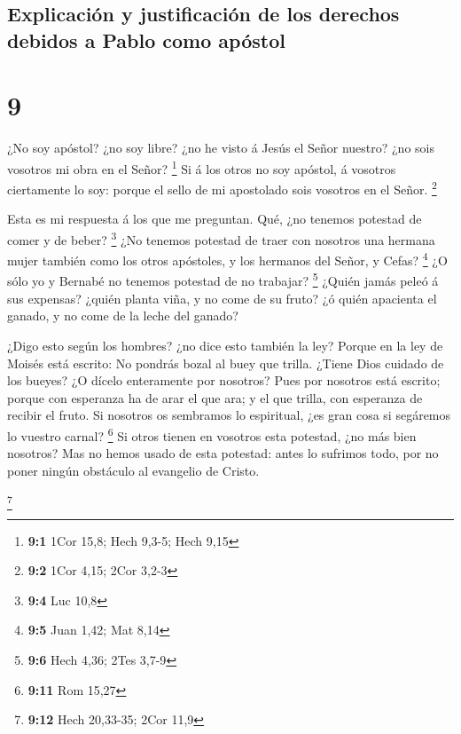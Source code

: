\hypertarget{explicaciuxf3n-y-justificaciuxf3n-de-los-derechos-debidos-a-pablo-como-apuxf3stol}{%
\subsection{Explicación y justificación de los derechos debidos a Pablo
como
apóstol}\label{explicaciuxf3n-y-justificaciuxf3n-de-los-derechos-debidos-a-pablo-como-apuxf3stol}}

\hypertarget{section-8}{%
\section{9}\label{section-8}}

 ¿No soy apóstol? ¿no soy libre? ¿no he visto á Jesús el
Señor nuestro? ¿no sois vosotros mi obra en el Señor? \footnote{\textbf{9:1}
  1Cor 15,8; Hech 9,3-5; Hech 9,15}  Si á los otros no soy
apóstol, á vosotros ciertamente lo soy: porque el sello de mi apostolado
sois vosotros en el Señor. \footnote{\textbf{9:2} 1Cor 4,15; 2Cor 3,2-3}

 Esta es mi respuesta á los que me preguntan.
 Qué, ¿no tenemos potestad de comer y de beber?
\footnote{\textbf{9:4} Luc 10,8}  ¿No tenemos potestad de
traer con nosotros una hermana mujer también como los otros apóstoles, y
los hermanos del Señor, y Cefas? \footnote{\textbf{9:5} Juan 1,42; Mat
  8,14}  ¿O sólo yo y Bernabé no tenemos potestad de no
trabajar? \footnote{\textbf{9:6} Hech 4,36; 2Tes 3,7-9} 
¿Quién jamás peleó á sus expensas? ¿quién planta viña, y no come de su
fruto? ¿ó quién apacienta el ganado, y no come de la leche del ganado?

 ¿Digo esto según los hombres? ¿no dice esto también la
ley?  Porque en la ley de Moisés está escrito: No pondrás
bozal al buey que trilla. ¿Tiene Dios cuidado de los bueyes?
 ¿O dícelo enteramente por nosotros? Pues por nosotros
está escrito; porque con esperanza ha de arar el que ara; y el que
trilla, con esperanza de recibir el fruto.  Si nosotros
os sembramos lo espiritual, ¿es gran cosa si segáremos lo vuestro
carnal? \footnote{\textbf{9:11} Rom 15,27}  Si otros
tienen en vosotros esta potestad, ¿no más bien nosotros? Mas no hemos
usado de esta potestad: antes lo sufrimos todo, por no poner ningún
obstáculo al evangelio de Cristo.

\footnote{\textbf{9:12} Hech 20,33-35; 2Cor 11,9}


